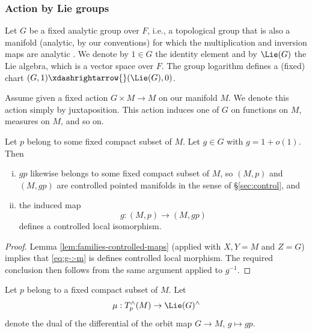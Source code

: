 \subsubsection{Action by Lie groups}\label{sec:translation}
Let $G$ be a fixed analytic group over $F$, i.e., a topological group that is also a manifold (analytic, by our conventions) for which the multiplication and inversion maps are analytic \cite[\S II.IV]{MR2179691}.  We denote by $1 \in G$ the identity element and by $\Lie(G)$ the Lie algebra, which is a vector space over $F$.  The group logarithm defines a (fixed) chart $(G,1) \xdashrightarrow{} (\Lie(G), 0)$.

Assume given a fixed action $G \times M \rightarrow M$ on our manifold $M$.  We denote this action simply by juxtaposition.  This action induces one of $G$ on functions on $M$, measures on $M$, and so on.

\begin{lemma}\label{lem:standard2:G-defines-controlled-local-isoms}
  Let $p$ belong to some fixed compact subset of $M$.  Let $g \in G$ with $g = 1 + o(1)$.  Then
  \begin{enumerate}[(i)]
  \item $g p$ likewise belongs to some fixed compact subset of $M$, so $(M,p)$ and $(M, gp)$ are controlled pointed manifolds in the sense of \S\ref{sec:control}, and
  \item the induced map
    \begin{equation}\label{eq:g-:-m}
      g : (M,p) \rightarrow  (M, g p)
    \end{equation}
    defines a controlled local isomorphism.
  \end{enumerate}
\end{lemma}
\begin{proof}
  Lemma \ref{lem:families-controlled-maps} (applied with $X, Y = M$ and $Z = G$) implies that \eqref{eq:g-:-m} is defines controlled local morphism.  The required conclusion then follows from the same argument applied to $g^{-1}$.
\end{proof}

\begin{definition}
  Let $p$ belong to a fixed compact subset of $M$.  Let
  \begin{equation*}
    \mu : T_p^\wedge(M) \rightarrow \Lie(G)^\wedge
  \end{equation*}
  denote the dual of the differential of the orbit map $G \rightarrow M$, $g \mapsto g p$.
\end{definition}

